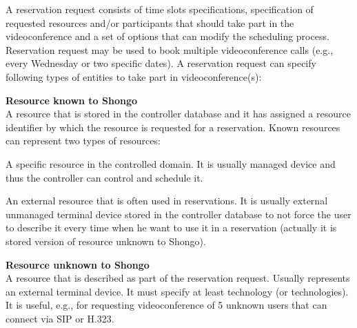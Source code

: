 A reservation request consists of time slots specifications, specification of requested resources and/or participants that should take part in the videoconference and a set of options that can modify the scheduling process. Reservation request may be used to book multiple videoconference calls (e.g., every Wednesday or two specific dates). A reservation request can specify following types of entities to take part in videoconference(s):
\begin{compactenum}
\item \textbf{Resource known to Shongo} \\
  A resource that is stored in the controller database and it has assigned 
  a resource identifier by which the resource is requested for 
  a reservation. Known resources can represent two types of resources:
  \begin{compactenum}
  \item A specific resource in the controlled domain. It is usually 
  managed device and thus the controller can control and schedule it.
  \item An external resource that is often used in reservations. It is 
  usually external unmanaged terminal device stored in the controller database
  to not force the user to describe it every time when he want to use it in 
  a reservation (actually it is stored version of resource unknown to Shongo).
  \end{compactenum}
\item \textbf{Resource unknown to Shongo} \\
  A resource that is described as part of the reservation request. Usually 
  represents an external terminal device. It must specify at least technology 
  (or technologies). It is useful, e.g., for requesting videoconference 
  of 5 unknown users that can connect via SIP or H.323.
  

\end{compactenum}
